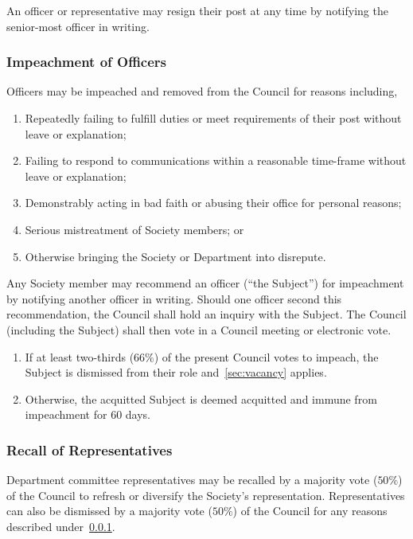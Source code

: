 An officer or representative may resign their post at any time by notifying the
senior-most officer in writing.

\subsubsection{Impeachment of Officers}\label{sec:impeachment}

Officers may be impeached and removed from the Council for reasons including,

\begin{enumerate}
      \item Repeatedly failing to fulfill duties or meet requirements of their post without
            leave or explanation;
      \item Failing to respond to communications within a reasonable time-frame without
            leave or explanation;
      \item Demonstrably acting in bad faith or abusing their office for personal reasons;
      \item Serious mistreatment of Society members; or
      \item Otherwise bringing the Society or Department into disrepute.
\end{enumerate}

Any Society member may recommend an officer (``the Subject'') for impeachment
by notifying another officer in writing. Should one officer second this
recommendation, the Council shall hold an inquiry with the Subject. The Council
(including the Subject) shall then vote in a Council meeting or electronic
vote.

\begin{enumerate}
      \item If at least two-thirds ($66\%$) of the present Council votes to impeach, the
            Subject is dismissed from their role and~\ref{sec:vacancy} applies.
      \item Otherwise, the acquitted Subject is deemed acquitted and immune from
            impeachment for 60 days.
\end{enumerate}

\subsubsection{Recall of Representatives}\label{sec:recall}

Department committee representatives may be recalled by a majority vote
($50\%$) of the Council to refresh or diversify the Society's representation.
Representatives can also be dismissed by a majority vote ($50\%$) of the
Council for any reasons described under~\ref{sec:impeachment}.

